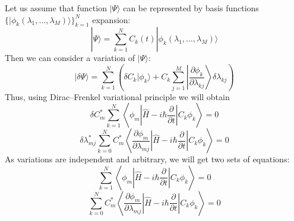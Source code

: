 Let us assume that function $|\Psi\rangle$ can be represented by  basis functions \\
$\{|\phi_k(\lambda_1,\ldots,\lambda_M)\rangle\}_{k=1}^N$ expansion:
$$|\Psi\rangle = \sum_{k=1}^NC_k(t)|\phi_k(\lambda_1,\ldots,\lambda_M)\rangle$$
Then we can consider a variation of $|\Psi\rangle$:
$$|\delta\Psi\rangle = \sum_{k=1}^N \left( \delta C_k|\phi_k\rangle + %
					   C_k\sum_{j=1}^M\left|\frac{\partial\phi_k}{\partial\lambda_{kj}}\right\rangle\delta\lambda_{kj} \right)$$
Thus, using Dirac--Frenkel variational principle we will obtain
$$\delta C_m^*\sum_{k=1}^N\left\langle\phi_m\left|\hat{H}-i\hbar\frac{\partial}{\partial t}\right|C_k\phi_k\right\rangle=0$$
$$\delta\lambda_{mj}^*\sum_{k=0}^NC_m^*\left\langle\frac{\partial\phi_m}{\partial\lambda_{mj}}\left|\hat{H}-i\hbar\frac{\partial}{\partial t}\right|C_k\phi_k\right\rangle = 0$$
As variations are independent and arbitrary, we will get two sets of equations:
$$\sum_{k=1}^N\left\langle\phi_m\left|\hat{H}-i\hbar\frac{\partial}{\partial t}\right|C_k\phi_k\right\rangle=0$$
$$\sum_{k=0}^NC_m^*\left\langle\frac{\partial\phi_m}{\partial\lambda_{mj}}\left|\hat{H}-i\hbar\frac{\partial}{\partial t}\right|C_k\phi_k\right\rangle = 0$$

